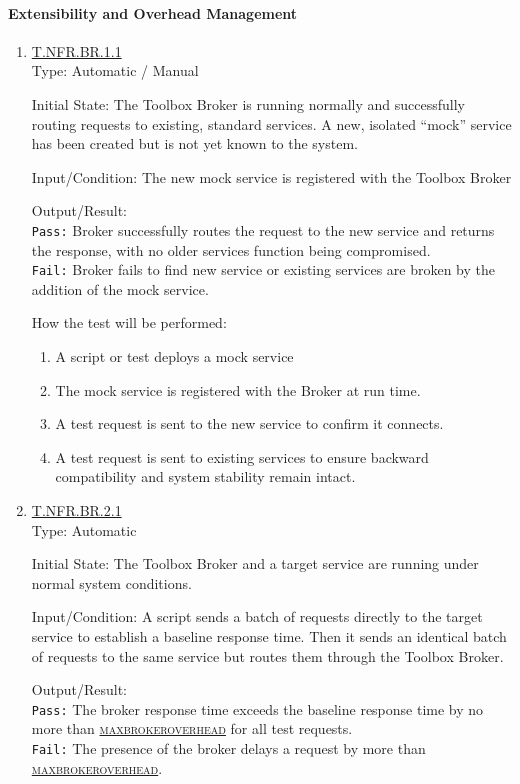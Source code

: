 \documentclass[12pt, titlepage]{article}
\newcommand{\testdef}[1]{\leavevmode\hypertarget{test:#1}{}\hyperlink{trace:#1}{#1}}
\DeclareRobustCommand{\cname}[1]{{\renewcommand{\_}{\textunderscore\allowbreak}\textsc{#1}}}
\newcommand{\constfirst}[1]{\leavevmode\hypertarget{constfirst:\detokenize{#1}}{}\hyperlink{const:\detokenize{#1}}{\cname{#1}}}
\newcommand{\const}[1]{\hyperlink{const:\detokenize{#1}}{\cname{#1}}}
\begin{document}
\paragraph{Extensibility and Overhead Management}
\begin{enumerate}
  \item \testdef{T.NFR.BR.1.1}\\
  Type: Automatic / Manual 

  Initial State: The Toolbox Broker is running normally and successfully routing requests to existing, standard services. A new, isolated ``mock'' service has been created but is not yet known to the system.

  Input/Condition: The new mock service is registered with the Toolbox Broker

  Output/Result: \\
  \texttt{Pass:} Broker successfully routes the request to the new service and returns the response, with no older services function being compromised.\\
  \texttt{Fail:} Broker fails to find new service or existing services are broken by the addition of the mock service.

  How the test will be performed:
  \begin{enumerate}
    \item A script or test deploys a mock service
    \item The mock service is registered with the Broker at run time.
    \item A test request is sent to the new service to confirm it connects.
    \item A test request is sent to existing services to ensure backward compatibility and system stability remain intact.
  \end{enumerate}
  
  \item \testdef{T.NFR.BR.2.1}\\
  Type: Automatic

  Initial State: The Toolbox Broker and a target service are running under normal system conditions.

  Input/Condition: A script sends a batch of requests directly to the target service to establish a baseline response time. Then it sends an identical batch of requests to the same service but routes them through the Toolbox Broker.

  Output/Result:\\
  \texttt{Pass:} The broker response time exceeds the baseline response time by no more than \constfirst{max\_broker\_overhead} for all test requests.\\
  \texttt{Fail:} The presence of the broker delays a request by more than \const{max\_broker\_overhead}.


\end{enumerate}
\end{document}
